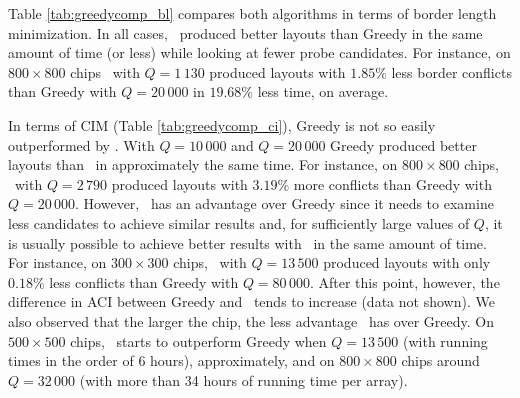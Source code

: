 Table \ref{tab:greedycomp_bl} compares both algorithms in terms of border length
minimization. In all cases, \Greedyplus\ produced better layouts than Greedy in
the same amount of time (or less) while looking at fewer probe candidates. For
instance, on $800\times 800$ chips \Greedyplus\ with $Q=1\,130$ produced layouts
with $1.85\%$ less border conflicts than Greedy with $Q=20\,000$ in $19.68\%$
less time, on average.

In terms of CIM (Table \ref{tab:greedycomp_ci}), Greedy is not so easily
outperformed by \Greedyplus. With $Q=10\,000$ and $Q=20\,000$ Greedy produced
better layouts than \Greedyplus\ in approximately the same time. For instance,
on $800\times 800$ chips, \Greedyplus\ with $Q=2\,790$ produced layouts with
$3.19\%$ more conflicts than Greedy with $Q=20\,000$. However, \Greedyplus\ has
an advantage over Greedy since it needs to examine less candidates to achieve
similar results and, for sufficiently large values of $Q$, it is usually
possible to achieve better results with \Greedyplus\ in the same amount of time.
For instance, on $300\times 300$ chips, \Greedyplus\ with $Q=13\,500$ produced
layouts with only $0.18\%$ less conflicts than Greedy with $Q=80\,000$. After
this point, however, the difference in ACI between Greedy and \Greedyplus\ tends
to increase (data not shown). We also observed that the larger the chip, the
less advantage \Greedyplus\ has over Greedy. On $500\times 500$ chips,
\Greedyplus\ starts to outperform Greedy when $Q=13\,500$ (with running times in
the order of 6 hours), approximately, and on $800\times 800$ chips around
$Q=32\,000$ (with more than 34 hours of running time per array).

